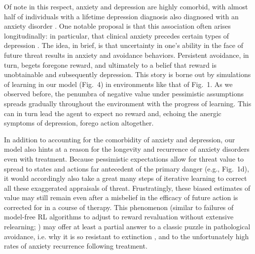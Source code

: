 \documentclass[11pt]{article} %
\begin{document}
Of note in this respect, anxiety and depression are highly comorbid, with almost half of individuals with a lifetime depression diagnosis also diagnosed with an anxiety disorder \citep{kessler2015}. One notable proposal is that this association often arises longitudinally: in particular, that clinical anxiety precedes certain types of depression \citep{alloy1990, jacobson2014}. The idea, in brief, is that uncertainty in one's ability in the face of future threat results in anxiety and avoidance behaviors. Persistent avoidance, in turn, begets foregone reward, and ultimately to a belief that reward is unobtainable and subsequently depression. This story is borne out by simulations of learning in our model (Fig.~4) in environments like that of Fig.~1. As we observed before, the penumbra of negative value under pessimistic assumptions spreads gradually throughout the environment with the progress of learning. This can in turn lead the agent to expect no reward and, echoing the anergic symptoms of depression, forego action altogether.

In addition to accounting for the comorbidity of anxiety and depression, our model also hints at a reason for the longevity and recurrence of anxiety disorders even with treatment. Because pessimistic expectations allow for threat value to spread to states and actions far antecedent of the primary danger (e.g., Fig.~1d), it would accordingly also take a great many steps of iterative learning to correct all these exaggerated appraisals of threat. Frustratingly, these biased estimates of value may still remain even after a misbelief in the efficacy of future action is corrected for in a course of therapy. This phenomenon (similar to failures of model-free RL algorithms to adjust to reward revaluation without extensive relearning; \cite{daw2005}) may offer at least a partial answer to a classic puzzle in pathological avoidance, i.e. why it is so resistant to extinction \cite{moutoussis2018}, and to the unfortunately high rates of anxiety recurrence following treatment\citep{pittig2018}.
\end{document}
